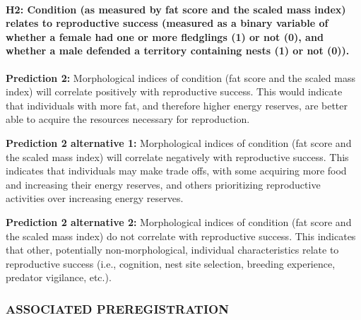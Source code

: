 \documentclass[
]{article}
\begin{document}
\hypertarget{h2-condition-as-measured-by-fat-score-and-the-scaled-mass-index-relates-to-reproductive-success-measured-as-a-binary-variable-of-whether-a-female-had-one-or-more-fledglings-1-or-not-0-and-whether-a-male-defended-a-territory-containing-nests-1-or-not-0.}{%
\paragraph{H2: Condition (as measured by fat score and the scaled mass
index) relates to reproductive success (measured as a binary variable of
whether a female had one or more fledglings (1) or not (0), and whether
a male defended a territory containing nests (1) or not
(0)).}\label{h2-condition-as-measured-by-fat-score-and-the-scaled-mass-index-relates-to-reproductive-success-measured-as-a-binary-variable-of-whether-a-female-had-one-or-more-fledglings-1-or-not-0-and-whether-a-male-defended-a-territory-containing-nests-1-or-not-0.}}

\textbf{Prediction 2:} Morphological indices of condition (fat score and
the scaled mass index) will correlate positively with reproductive
success. This would indicate that individuals with more fat, and
therefore higher energy reserves, are better able to acquire the
resources necessary for reproduction.

\textbf{Prediction 2 alternative 1:} Morphological indices of condition
(fat score and the scaled mass index) will correlate negatively with
reproductive success. This indicates that individuals may make trade
offs, with some acquiring more food and increasing their energy
reserves, and others prioritizing reproductive activities over
increasing energy reserves.

\textbf{Prediction 2 alternative 2:} Morphological indices of condition
(fat score and the scaled mass index) do not correlate with reproductive
success. This indicates that other, potentially non-morphological,
individual characteristics relate to reproductive success (i.e.,
cognition, nest site selection, breeding experience, predator vigilance,
etc.).

\hypertarget{associated-preregistration}{%
\subsubsection{ASSOCIATED
PREREGISTRATION}\label{associated-preregistration}}
\end{document}
